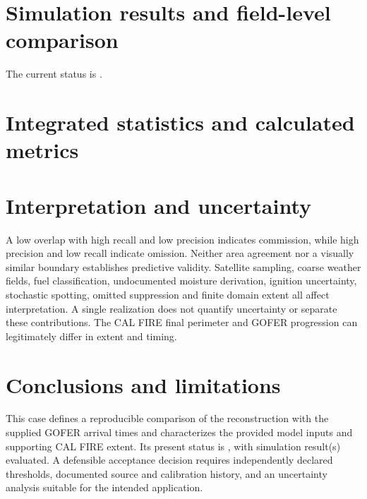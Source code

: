\section{Simulation results and field-level comparison}

The current status is \textbf{}. 
\SimulationFields{}

\section{Integrated statistics and calculated metrics}

\IntegratedResults{}
\SimulationMetrics{}

\section{Interpretation and uncertainty}

A low overlap with high recall and low precision indicates commission, while
high precision and low recall indicate omission. Neither area agreement nor a
visually similar boundary establishes predictive validity. Satellite sampling,
coarse weather fields, fuel classification, undocumented moisture derivation,
ignition uncertainty, stochastic spotting, omitted suppression and finite domain
extent all affect interpretation. A single realization does not quantify
uncertainty or separate these contributions. The CAL FIRE final perimeter and
GOFER progression can legitimately differ in extent and timing.

\section{Conclusions and limitations}

This case defines a reproducible comparison of the \FireName{} reconstruction
with the supplied GOFER arrival times and characterizes the provided model
inputs and supporting CAL FIRE extent. Its present status is
\textbf{}, with  simulation result(s)
evaluated. A defensible acceptance decision requires independently declared
thresholds, documented source and calibration history, and an uncertainty
analysis suitable for the intended application.

